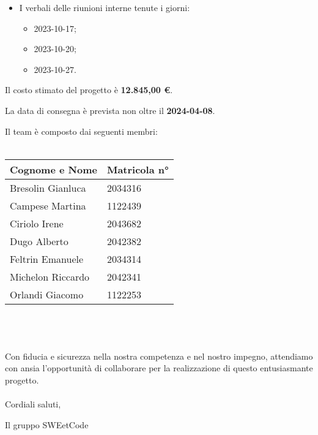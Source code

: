 \documentclass{article}
\begin{document}
    \begin{itemize}
        \item I verbali delle riunioni interne tenute i giorni:
         \begin{itemize}
        \item 2023-10-17;
        \item 2023-10-20;
        \item 2023-10-27.
    \end{itemize}
        \end{itemize}

\vspace{2em}
Il costo stimato del progetto è \textbf{12.845,00 €}.

La data di consegna è prevista non oltre il \textbf{2024-04-08}.

\vspace{1em}
Il team è composto dai seguenti membri:
\\
\\
{\renewcommand{\arraystretch}{1.5}
\begin{tabularx}{\textwidth}{X|X}
\textbf{Cognome e Nome} & \textbf{Matricola n°} \\
\hline
Bresolin Gianluca & 2034316 \\
\hline
Campese Martina & 1122439 \\
\hline
Ciriolo Irene & 2043682 \\
\hline
Dugo Alberto & 2042382 \\
\hline
Feltrin Emanuele & 2034314 \\
\hline
Michelon Riccardo & 2042341 \\
\hline
Orlandi Giacomo & 1122253 \\
\end{tabularx}}\\
\\
\\
Con fiducia e sicurezza nella nostra competenza e nel nostro impegno, attendiamo con ansia l’opportunità di collaborare per la realizzazione di questo entusiasmante progetto.
\\
\\
Cordiali saluti,

Il gruppo SWEetCode
\end{document}

